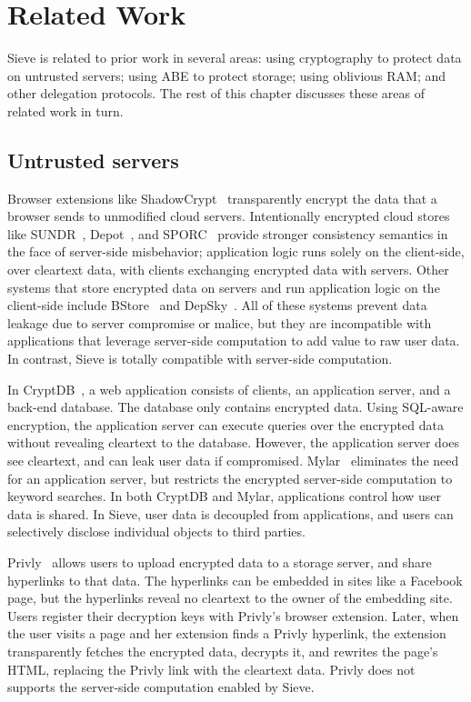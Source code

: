 \chapter{Related Work}
\label{sec:related}

Sieve is related to prior work in
several areas: using cryptography to protect data on untrusted
servers; using ABE to protect storage; using oblivious RAM; and other
delegation protocols.  The rest of this chapter discusses these areas
of related work in turn.

\section{Untrusted servers} 
Browser extensions
like ShadowCrypt~\cite{shadowCrypt} transparently
encrypt the data that a browser sends to
unmodified cloud servers. Intentionally
encrypted cloud stores like SUNDR~\cite{sundr},
Depot~\cite{depot}, and SPORC~\cite{sporc}
provide stronger consistency semantics in the
face of server-side misbehavior; application
logic runs solely on the client-side, over
cleartext data, with clients exchanging encrypted
data with servers. 
Other systems that store encrypted data on servers
and run application logic on the client-side
include BStore~\cite{bstore} and DepSky~\cite{depSky}.
All of these systems prevent
data leakage due to server compromise or malice,
but they are incompatible with applications that
leverage server-side computation to add value to
raw user data. In contrast, Sieve 
is totally compatible with server-side computation.

In CryptDB~\cite{cryptdb}, a web application
consists of clients, an application server,
and a back-end database. The database only
contains encrypted data. Using SQL-aware encryption,
the application server can execute queries over
the encrypted data without revealing cleartext
to the database. However, the application server
does see cleartext, and can leak user data if
compromised. Mylar~\cite{mylar} eliminates the
need for an application server, but restricts
the encrypted server-side computation to keyword
searches. In both CryptDB and Mylar, applications
control how user data is shared. In Sieve, user
data is decoupled from applications, and users
can selectively disclose individual objects to
third parties.

Privly~\cite{privly} allows users to upload
encrypted data to a storage server, and share
hyperlinks to that data. The hyperlinks can be
embedded in sites like a Facebook page, but
the hyperlinks reveal no cleartext to the
owner of the embedding site. Users register
their decryption keys with Privly's browser
extension. Later, when the user visits a page
and her extension finds a Privly hyperlink,
the extension transparently fetches the
encrypted data, decrypts it, and rewrites
the page's HTML, replacing the Privly link
with the cleartext data. Privly does not supports
the server-side computation enabled
by Sieve.


